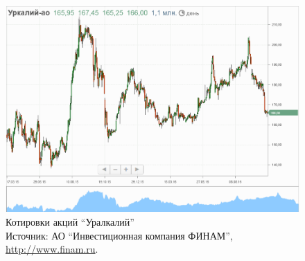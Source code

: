 \documentclass[_Banking_p2.tex]{subfiles}
\begin{document}
\begin{frame}{}
\begin{figure}	
\centering
\includegraphics[scale=0.3]{img/URKA_quotes.png}
\caption{Котировки акций ``Уралкалий''\\ 
Источник: АО ``Инвестиционная компания ФИНАМ'', \url{http://www.finam.ru}.}\label{fig:URKA_quotes}
\end{figure}
\end{frame}
\end{document}

